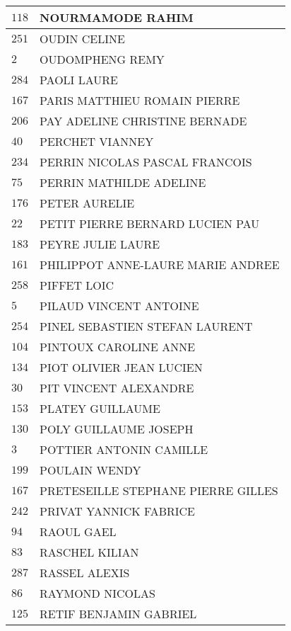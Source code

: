 \begin{xltabular}{\linewidth}{|l|X|}
    \hline
    $118$ & NOURMAMODE RAHIM \\
    \hline
    $251$ & OUDIN CELINE \\
    \hline
    $2$ & OUDOMPHENG REMY \\
    \hline
    $284$ & PAOLI LAURE \\
    \hline
    $167$ & PARIS MATTHIEU ROMAIN PIERRE \\
    \hline
    $206$ & PAY ADELINE CHRISTINE BERNADE \\
    \hline
    $40$ & PERCHET VIANNEY \\
    \hline
    $234$ & PERRIN NICOLAS PASCAL FRANCOIS \\
    \hline
    $75$ & PERRIN MATHILDE ADELINE \\
    \hline
    $176$ & PETER AURELIE \\
    \hline
    $22$ & PETIT PIERRE BERNARD LUCIEN PAU \\
    \hline
    $183$ & PEYRE JULIE LAURE \\
    \hline
    $161$ & PHILIPPOT ANNE-LAURE MARIE ANDREE \\
    \hline
    $258$ & PIFFET LOIC \\
    \hline
    $5$ & PILAUD VINCENT ANTOINE \\
    \hline
    $254$ & PINEL SEBASTIEN STEFAN LAURENT \\
    \hline
    $104$ & PINTOUX CAROLINE ANNE \\
    \hline
    $134$ & PIOT OLIVIER JEAN LUCIEN \\
    \hline
    $30$ & PIT VINCENT ALEXANDRE \\
    \hline
    $153$ & PLATEY GUILLAUME \\
    \hline
    $130$ & POLY GUILLAUME JOSEPH \\
    \hline
    $3$ & POTTIER ANTONIN CAMILLE \\
    \hline
    $199$ & POULAIN WENDY \\
    \hline
    $167$ & PRETESEILLE STEPHANE PIERRE GILLES \\
    \hline
    $242$ & PRIVAT YANNICK FABRICE \\
    \hline
    $94$ & RAOUL GAEL \\
    \hline
    $83$ & RASCHEL KILIAN \\
    \hline
    $287$ & RASSEL ALEXIS \\
    \hline
    $86$ & RAYMOND NICOLAS \\
    \hline
    $125$ & RETIF BENJAMIN GABRIEL \\

\end{xltabular}
